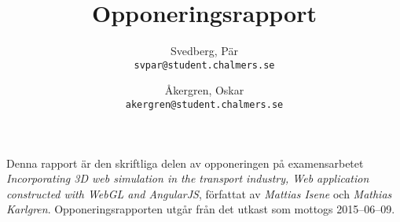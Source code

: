 \documentclass[a4paper, 11pt]{article}
\author{
    Svedberg, Pär \\ \texttt{svpar@student.chalmers.se}
    \and
    Åkergren, Oskar \\ \texttt{akergren@student.chalmers.se}
}
\title{\vspace{-3cm}Opponeringsrapport}
\begin{document}
\maketitle
\vspace{-0.5cm}Denna rapport är den skriftliga delen av opponeringen på examensarbetet \emph{Incorporating 3D web simulation in the transport industry, Web application constructed with WebGL and AngularJS}, författat av \emph{Mattias Isene} och \emph{Mathias Karlgren}. Opponerings\-rapporten utgår från det utkast som mottogs 2015--06--09.




\end{document}
